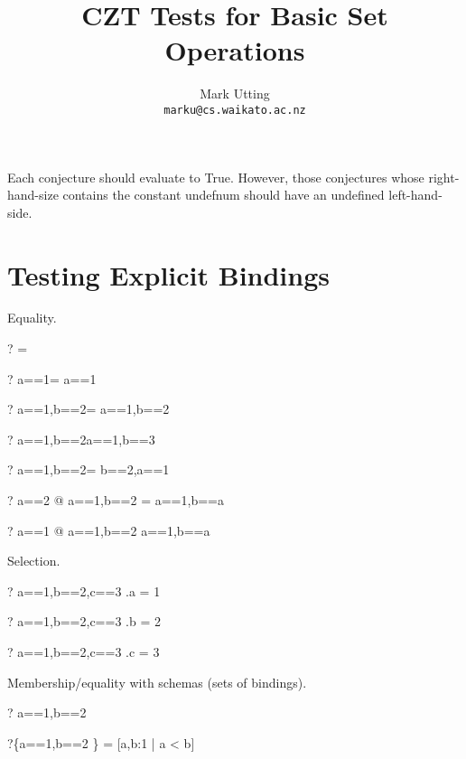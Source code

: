 \documentclass{article}
\title{CZT Tests for Basic Set Operations}
\author{Mark Utting \\ \texttt{marku@cs.waikato.ac.nz}}
\begin{document}
\maketitle

Each conjecture should evaluate to True.
However, those conjectures whose right-hand-size contains
the constant undefnum should have an undefined left-hand-side.


\section{Testing Explicit Bindings}

Equality.
\begin{zed}\vdash? \lblot\rblot= \lblot\rblot\end{zed}
\begin{zed}\vdash? \lblot a==1\rblot= \lblot a==1\rblot\end{zed}
\begin{zed}\vdash? \lblot a==1,b==2\rblot= \lblot a==1,b==2\rblot\end{zed}
\begin{zed}\vdash? \lblot a==1,b==2\rblot\neq \lblot a==1,b==3\rblot\end{zed}
\begin{zed}\vdash? \lblot a==1,b==2\rblot= \lblot b==2,a==1\rblot\end{zed}
\begin{zed}\vdash? \forall a==2 @ \lblot a==1,b==2 \rblot = \lblot a==1,b==a\rblot\end{zed}
\begin{zed}\vdash? \forall a==1 @ \lblot a==1,b==2 \rblot \neq \lblot a==1,b==a\rblot\end{zed}

Selection.
\begin{zed}\vdash? \lblot a==1,b==2,c==3 \rblot.a = 1 \end{zed}
\begin{zed}\vdash? \lblot a==1,b==2,c==3 \rblot.b = 2 \end{zed}
\begin{zed}\vdash? \lblot a==1,b==2,c==3 \rblot.c = 3 \end{zed}

Membership/equality with schemas (sets of bindings).
\begin{zed}\vdash? \lblot a==1,b==2 \rblot \in [a,b:1 \upto 3 | a < b]\end{zed}
\begin{zed}\vdash?\{\lblot a==1,b==2 \rblot\} = [a,b:1  | a < b]\end{zed}
\end{document}
